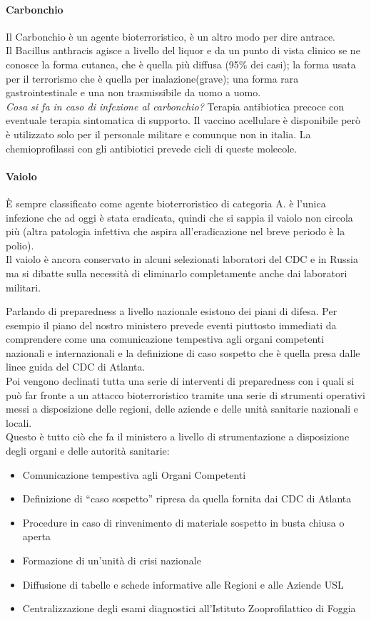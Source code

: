\paragraph{Carbonchio}
Il Carbonchio è un agente bioterroristico, è un altro modo per dire
antrace.\\
Il Bacillus anthracis agisce a livello del liquor e da un punto di vista
clinico se ne conosce la forma cutanea, che è quella più diffusa (95\%
dei casi); la forma usata per il terrorismo che è quella per
inalazione(grave); una forma rara gastrointestinale e una non
trasmissibile da uomo a uomo.\\
\emph{Cosa si fa in caso di infezione al carbonchio?} Terapia
antibiotica precoce con eventuale terapia sintomatica di supporto. Il
vaccino acellulare è disponibile però è utilizzato solo per il personale
militare e comunque non in italia. La chemioprofilassi con gli
antibiotici prevede cicli di queste molecole.

\paragraph{Vaiolo}
È sempre classificato come agente bioterroristico di categoria A. è
l'unica infezione che ad oggi è stata eradicata, quindi che si sappia il
vaiolo non circola più (altra patologia infettiva che aspira
all'eradicazione nel breve periodo è la polio).\\
Il vaiolo è ancora conservato in alcuni selezionati laboratori del CDC e
in Russia ma si dibatte sulla necessità di eliminarlo completamente
anche dai laboratori militari.

Parlando di preparedness a livello nazionale esistono dei piani di
difesa. Per esempio il piano del nostro ministero prevede eventi
piuttosto immediati da comprendere come una comunicazione tempestiva
agli organi competenti nazionali e internazionali e la definizione di
caso sospetto che è quella presa dalle linee guida del CDC di Atlanta.\\
Poi vengono declinati tutta una serie di interventi di preparedness con
i quali si può far fronte a un attacco bioterroristico tramite una serie
di strumenti operativi messi a disposizione delle regioni, delle aziende
e delle unità sanitarie nazionali e locali.\\
Questo è tutto ciò che fa il ministero a livello di strumentazione a
disposizione degli organi e delle autorità sanitarie:
\begin{itemize}
\item Comunicazione tempestiva agli Organi Competenti
\item Definizione di ``caso sospetto'' ripresa da quella fornita dai CDC di
Atlanta
\item Procedure in caso di rinvenimento di materiale sospetto in busta
chiusa o aperta
\item Formazione di un'unità di crisi nazionale
\item Diffusione di tabelle e schede informative alle Regioni e alle Aziende
USL
\item Centralizzazione degli esami diagnostici all'Istituto Zooprofilattico
di Foggia
\end{itemize}

